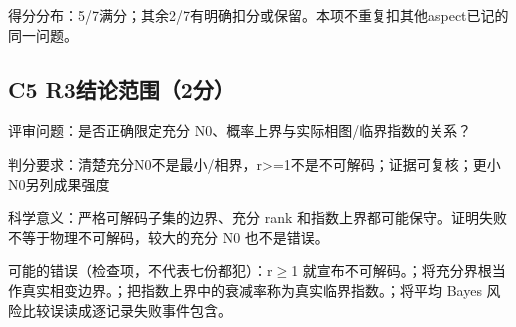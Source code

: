 \documentclass[11pt,a4paper]{article}
\begin{document}
得分分布：5/7满分；其余2/7有明确扣分或保留。本项不重复扣其他aspect已记的同一问题。

\clearpage
\subsection{C5 R3结论范围（2分）}
\label{aspect:C5}
评审问题：是否正确限定充分 N0、概率上界与实际相图/临界指数的关系？

判分要求：清楚充分N0不是最小/相界，r>=1不是不可解码；证据可复核；更小N0另列成果强度

科学意义：严格可解码子集的边界、充分 rank 和指数上界都可能保守。证明失败不等于物理不可解码，较大的充分 N0 也不是错误。

可能的错误（检查项，不代表七份都犯）：r\ensuremath{\geq}1 就宣布不可解码。；将充分界根当作真实相变边界。；把指数上界中的衰减率称为真实临界指数。；将平均 Bayes 风险比较误读成逐记录失败事件包含。
\end{document}
